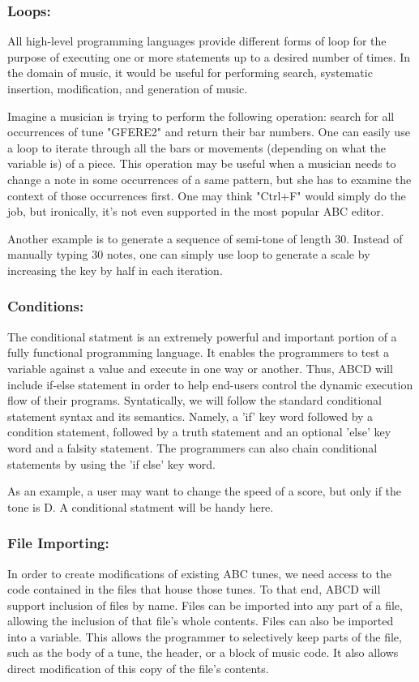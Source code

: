 	\subsubsection{Loops:}
	All high-level programming languages provide different forms of loop for the purpose of executing one or more statements up to a desired number of times. In the domain of music, it would be useful for performing search, systematic insertion, modification, and generation of music. 

	Imagine a musician is trying to perform the following operation: search for all occurrences of tune "GFERE2" and return their bar numbers. One can easily use a loop to iterate through all the bars or movements (depending on what the variable is) of a piece. This operation may be useful when a musician needs to change a note in some occurrences of a same pattern, but she has to examine the context of those occurrences first. One may think "Ctrl+F" would simply do the job, but ironically, it's not even supported in the most popular ABC editor\cite{SlashdotMedia17}.  

	Another example is to generate a sequence of semi-tone of length 30. Instead of manually typing 30 notes, one can simply use loop to generate a scale by increasing the key by half in each iteration.

	\subsubsection{Conditions:}
		The conditional statment is an extremely powerful and important portion of a fully functional programming language. It enables the programmers to test a variable against a value and execute in one way or another. Thus, ABCD will include if-else statement in order to help end-users control the dynamic execution flow of their programs. Syntatically, we will follow the standard conditional statement syntax and its semantics. Namely, a 'if' key word followed by a condition statement, followed by a truth statement and an optional 'else' key word and a falsity statement. The programmers can also chain conditional statements by using the 'if else' key word.

		As an example, a user may want to change the speed of a score, but only if the tone is D. A conditional statment will be handy here.
	\subsubsection{File Importing:}
	In order to create modifications of existing ABC tunes, we need access to the code contained in the files that house those tunes. To that end, ABCD will support inclusion of files by name. Files can be imported into any part of a file, allowing the inclusion of that file's whole contents. Files can also be imported into a variable. This allows the programmer to selectively keep parts of the file, such as the body of a tune, the header, or a block of music code. It also allows direct modification of this copy of the file's contents. 
	
